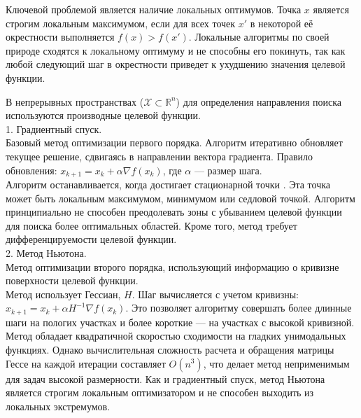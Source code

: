 Ключевой проблемой является наличие локальных оптимумов. Точка $x$ является строгим локальным максимумом, если для всех точек $x'$ в некоторой её окрестности выполняется $f(x) > f(x')$. Локальные алгоритмы по своей природе сходятся к локальному оптимуму и не способны его покинуть, так как любой следующий шаг в окрестности приведет к ухудшению значения целевой функции.

В непрерывных пространствах ($\mathcal{X} \subset \mathbb{R}^n$) для определения направления поиска используются производные целевой функции. \\

1. Градиентный спуск. \\
Базовый метод оптимизации первого порядка.
Алгоритм итеративно обновляет текущее решение, сдвигаясь в направлении вектора градиента. Правило обновления: $x_{k+1} = x_k + \alpha \nabla f(x_k)$, где $\alpha$ — размер шага. \\
Алгоритм останавливается, когда достигает стационарной точки . Эта точка может быть локальным максимумом, минимумом или седловой точкой. Алгоритм принципиально не способен преодолевать зоны с убыванием целевой функции для поиска более оптимальных областей. Кроме того, метод требует дифференцируемости целевой функции. \\
2. Метод Ньютона. \\
Метод оптимизации второго порядка, использующий информацию о кривизне поверхности целевой функции. \\
Метод использует Гессиан, $H$. Шаг вычисляется с учетом кривизны: $x_{k+1} = x_k + \alpha H^{-1} \nabla f(x_k)$. Это позволяет алгоритму совершать более длинные шаги на пологих участках и более короткие — на участках с высокой кривизной.
Метод обладает квадратичной скоростью сходимости на гладких унимодальных функциях. Однако вычислительная сложность расчета и обращения матрицы Гессе на каждой итерации составляет $O(n^3)$, что делает метод неприменимым для задач высокой размерности. Как и градиентный спуск, метод Ньютона является строгим локальным оптимизатором и не способен выходить из локальных экстремумов.

